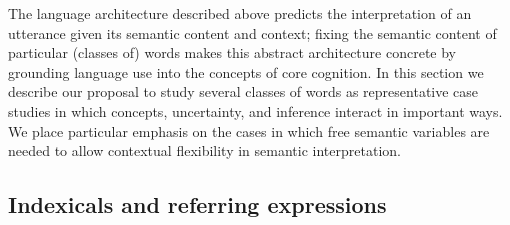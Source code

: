 \documentclass[12pt]{article}
\begin{document}






The language architecture described above predicts the interpretation of an utterance given its semantic content and context; fixing the semantic content of particular (classes of) words makes this abstract architecture concrete by grounding language use into the concepts of core cognition. In this section we describe our proposal to study several classes of words as representative case studies in which concepts, uncertainty, and inference interact in important ways. We place particular emphasis on the cases in which free semantic variables are needed to allow contextual flexibility in semantic interpretation.

\subsection{Indexicals and referring expressions}
\label{indexicals}
\end{document}
